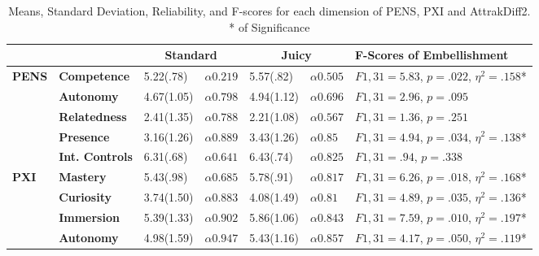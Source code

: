 \documentclass{sigchi}
\begin{document}
\begin{scriptsize}
\begin{table}
\caption{Means, Standard Deviation, Reliability, and F-scores for each dimension of PENS, PXI and AttrakDiff2. * of Significance}
  \label{table:QuakeTable}
\begin{tabular}{p{1.1cm}p{1.1cm}p{1.1cm}llll}
\hline
                    &                                 & \multicolumn{2}{c}{\textbf{Standard}} & \multicolumn{2}{c}{\textbf{Juicy}} & \textbf{F-Scores of Embellishment} \\ \hline
\textbf{PENS}       & \textbf{Competence}             & 5.22(.78)            & $\alpha0.219$          & 5.57(.82)          & $\alpha0.505$         & $F{1,31} = 5.83$, $p = .022$, $\eta^2=.158$*   \\
\textbf{}           & \textbf{Autonomy}               & 4.67(1.05)           & $\alpha0.798$          & 4.94(1.12)         & $\alpha0.696$         & $F{1,31} = 2.96$, $p = .095$             \\
\textbf{}           & \textbf{Relatedness}            & 2.41(1.35)           & $\alpha0.788$          & 2.21(1.08)         & $\alpha0.567$         & $F{1,31} = 1.36$, $p = .251$             \\
\textbf{}           & \textbf{Presence}               & 3.16(1.26)           & $\alpha0.889$          & 3.43(1.26)         & $\alpha0.85$          & $F{1,31} = 4.94$, $p = .034$, $\eta^2=.138$*   \\
\textbf{}           & \textbf{Int. Controls}          & 6.31(.68)            & $\alpha0.641$          & 6.43(.74)          & $\alpha0.825$         & $F{1,31} = .94$, $p = .338$              \\ \hline
\textbf{PXI}        & \textbf{Mastery}                & 5.43(.98)            & $\alpha0.685$          & 5.78(.91)          & $\alpha0.817$         & $F{1,31} = 6.26$, $p = .018$, $\eta^2=.168$*   \\
\textbf{}           & \textbf{Curiosity}              & 3.74(1.50)           & $\alpha0.883$          & 4.08(1.49)         & $\alpha0.81$          & $F{1,31} = 4.89$, $p = .035$, $\eta^2=.136$*   \\
\textbf{}           & \textbf{Immersion}              & 5.39(1.33)           & $\alpha0.902$          & 5.86(1.06)         & $\alpha0.843$         & $F{1,31} = 7.59$, $p = .010$, $\eta^2=.197$*   \\
\textbf{}           & \textbf{Autonomy}               & 4.98(1.59)           & $\alpha0.947$          & 5.43(1.16)         & $\alpha0.857$         & $F{1,31} = 4.17$, $p = .050$, $\eta^2=.119$*   \\

\end{tabular}
\end{table}
\end{scriptsize}
\end{document}
